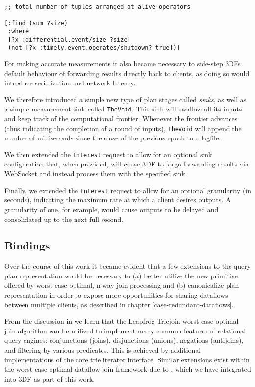 \documentclass[../index.tex]{subfiles}
\begin{document}
\begin{verbatim}
;; total number of tuples arranged at alive operators

[:find (sum ?size)
 :where
 [?x :differential.event/size ?size]
 (not [?x :timely.event.operates/shutdown? true])]
\end{verbatim}

For making accurate measurements it also became necessary to
side-step 3DFs default behaviour of forwarding results directly back
to clients, as doing so would introduce serialization and network
latency.

We therefore introduced a simple new type of plan stages called
\emph{sinks}, as well as a simple measurement sink called
\texttt{TheVoid}. This sink will swallow all its inputs and keep track
of the computational frontier. Whenever the frontier advances (thus
indicating the completion of a round of inputs), \texttt{TheVoid} will
append the number of milliseconds since the close of the previous
epoch to a logfile.

We then extended the \texttt{Interest} request to allow for an
optional sink configuration that, when provided, will cause 3DF to
forgo forwarding results via WebSocket and instead process them with
the specified sink.

Finally, we extended the \texttt{Interest} request to allow for an
optional granularity (in seconds), indicating the maximum rate at
which a client desires outputs. A granularity of one, for example,
would cause outputs to be delayed and consolidated up to the next full
second.

\subsection{Bindings} \label{bindings}

Over the course of this work it became evident that a few extensions
to the query plan representation would be necessary to (a) better
utilize the new primitive offered by worst-case optimal, n-way join
processing and (b) canonicalize plan representation in order to expose
more opportunities for sharing dataflows between multiple clients, as
described in chapter \ref{case-redundant-dataflows}.

From the discussion in \cite{veldhuizen2012leapfrog} we learn that the
Leapfrog Triejoin worst-case optimal join algorithm can be utilized to
implement many common features of relational query engines:
conjunctions (joins), disjunctions (unions), negations (antijoins),
and filtering by various predicates. This is achieved by additional
implementations of the core trie iterator interface. Similar
extensions exist within the worst-case optimal dataflow-join framework
due to \cite{ammar2018distributed}, which we have integrated into 3DF
as part of this work.
\end{document}
